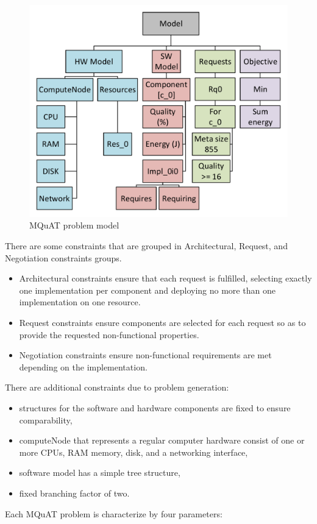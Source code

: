 \begin{figure}
	\centering
	\includegraphics[width=\textwidth]{images/MQuATModel}
	\caption[MQuAT problem model]{MQuAT problem model}
	\label{fig:mquatmodel}
\end{figure}

There are some constraints that are grouped in Architectural, Request, and Negotiation constraints groups.
\begin{itemize}
	\item Architectural constraints ensure that each request is fulfilled, selecting exactly one implementation per component and deploying no more than one implementation on one resource.
	\item Request constraints ensure components are selected for each request so as to provide the requested non-functional properties.
	\item Negotiation constraints ensure non-functional requirements are met depending on the implementation.
\end{itemize}
There are additional constraints due to problem generation:
\begin{itemize}
	\item structures for the software and hardware components are fixed to ensure comparability,
	\item computeNode that represents a regular computer hardware consist of one or more CPUs, RAM memory, disk, and a networking interface,
	\item software model has a simple tree structure,
	\item fixed branching factor of two.
\end{itemize}
Each MQuAT problem is characterize by four parameters:
